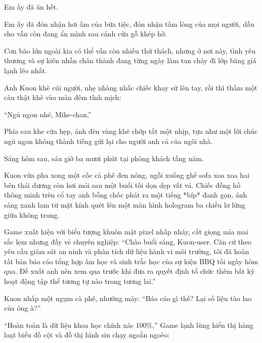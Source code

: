 \documentclass[../main.tex]{subfiles}
\begin{document}
Em ấy đã ăn hết.

Em ấy đã đón nhận hơi ấm của bữa tiệc, đón nhận tấm lòng của mọi người, dẫu cho vẫn còn đang ẩn mình sau cánh cửa gỗ khép hờ.

Cơn bão lớn ngoài kia có thể vẫn còn nhiều thử thách, nhưng ở nơi này, tình yêu thương và sự kiên nhẫn chân thành đang từng ngày làm tan chảy đi lớp băng giá lạnh lẽo nhất.

Anh Kuon khẽ cúi người, nhẹ nhàng nhấc chiếc khay sứ lên tay, rồi thì thầm một câu thật khẽ vào màn đêm tĩnh mịch:

``Ngủ ngon nhé, Mike-chan.''

Phía sau khe cửa hẹp, ánh đèn vàng khẽ chớp tắt một nhịp, tựa như một lời chúc ngủ ngon không thành tiếng gửi lại cho người anh cả của ngôi nhà.

\omk

\pov{-}

Sáng hôm sau, sáu giờ ba mươi phút tại phòng khách tầng năm.

Kuon vừa pha xong một cốc cà phê đen nóng, ngồi xuống ghế sofa xoa xoa hai bên thái dương còn hơi mỏi sau một buổi tối dọn dẹp vất vả. Chiếc đồng hồ thông minh trên cổ tay anh bỗng chốc phát ra một tiếng *bíp* đanh gọn, ánh sáng xanh lam từ mặt kính quét lên một màn hình hologram ba chiều lơ lửng giữa không trung.

Game xuất hiện với biểu tượng khuôn mặt pixel nhấp nháy, cất giọng mỉa mai sắc lẹm nhưng đầy vẻ chuyên nghiệp: ``Chào buổi sáng, Kuon-user. Căn cứ theo yêu cầu giám sát an ninh và phân tích dữ liệu hành vi môi trường, tôi đã hoàn tất bản báo cáo tổng hợp âm học và sinh trắc học của sự kiện BBQ tối ngày hôm qua. Đề xuất anh nên xem qua trước khi đưa ra quyết định tổ chức thêm bất kỳ hoạt động tập thể tương tự nào trong tương lai.''

Kuon nhấp một ngụm cà phê, nhướng mày: ``Báo cáo gì thế? Lại số liệu tào lao của ông à?''

``Hoàn toàn là dữ liệu khoa học chính xác 100\%,'' Game lạnh lùng hiển thị hàng loạt biểu đồ cột và đồ thị hình sin chạy ngoằn ngoèo:

\end{document}
